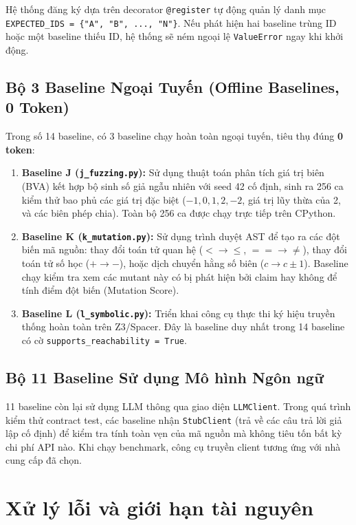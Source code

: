 Hệ thống đăng ký dựa trên decorator \texttt{@register} tự động quản lý danh mục \texttt{EXPECTED\_IDS = \{"A", "B", ..., "N"\}}. Nếu phát hiện hai baseline trùng ID hoặc một baseline thiếu ID, hệ thống sẽ ném ngoại lệ \texttt{ValueError} ngay khi khởi động.

\subsection{Bộ 3 Baseline Ngoại Tuyến (Offline Baselines, 0 Token)}
Trong số 14 baseline, có 3 baseline chạy hoàn toàn ngoại tuyến, tiêu thụ đúng \textbf{0 token}:
\begin{enumerate}
    \item \textbf{Baseline J (\texttt{j\_fuzzing.py}):} Sử dụng thuật toán phân tích giá trị biên (BVA) kết hợp bộ sinh số giả ngẫu nhiên với seed 42 cố định, sinh ra 256 ca kiểm thử bao phủ các giá trị đặc biệt ($-1, 0, 1, 2, -2$, giá trị lũy thừa của 2, và các biên phép chia). Toàn bộ 256 ca được chạy trực tiếp trên CPython.
    \item \textbf{Baseline K (\texttt{k\_mutation.py}):} Sử dụng trình duyệt AST để tạo ra các đột biến mã nguồn: thay đổi toán tử quan hệ ($< \rightarrow \le$, $== \rightarrow \ne$), thay đổi toán tử số học ($+ \rightarrow -$), hoặc dịch chuyển hằng số biên ($c \rightarrow c \pm 1$). Baseline chạy kiểm tra xem các mutant này có bị phát hiện bởi claim hay không để tính điểm đột biến (Mutation Score).
    \item \textbf{Baseline L (\texttt{l\_symbolic.py}):} Triển khai công cụ thực thi ký hiệu truyền thống hoàn toàn trên Z3/Spacer. Đây là baseline duy nhất trong 14 baseline có cờ \texttt{supports\_reachability = True}.
\end{enumerate}

\subsection{Bộ 11 Baseline Sử dụng Mô hình Ngôn ngữ}
11 baseline còn lại sử dụng LLM thông qua giao diện \texttt{LLMClient}. Trong quá trình kiểm thử contract test, các baseline nhận \texttt{StubClient} (trả về các câu trả lời giả lập cố định) để kiểm tra tính toàn vẹn của mã nguồn mà không tiêu tốn bất kỳ chi phí API nào. Khi chạy benchmark, công cụ truyền client tương ứng với nhà cung cấp đã chọn.

\section{Xử lý lỗi và giới hạn tài nguyên}
\label{sec:safety_fault_tolerance}


